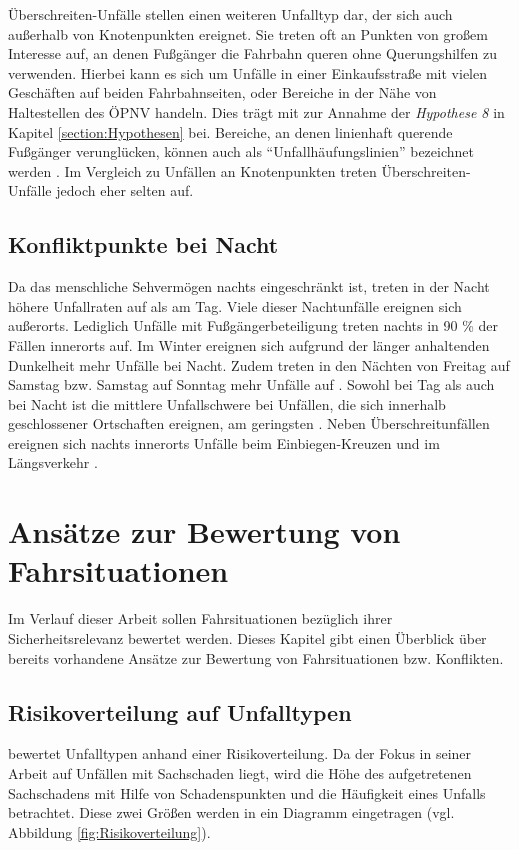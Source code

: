 Überschreiten-Unfälle stellen einen weiteren Unfalltyp dar, der sich auch außerhalb von Knotenpunkten ereignet. Sie treten oft an Punkten von großem Interesse auf, an denen Fußgänger die Fahrbahn queren ohne Querungshilfen zu verwenden. Hierbei kann es sich um Unfälle in einer Einkaufsstraße mit vielen Geschäften auf beiden Fahrbahnseiten, oder Bereiche in der Nähe von Haltestellen des \ac{ÖPNV} handeln. Dies trägt mit zur Annahme der \textit{Hypothese 8} in Kapitel \ref{section:Hypothesen} bei. Bereiche, an denen linienhaft querende Fußgänger verunglücken, können auch als \enquote{Unfallhäufungslinien} bezeichnet werden \parencite[S. 18]{ForschungsgesellschaftfurStraenundVerkehrswesen.2012}. Im Vergleich zu Unfällen an Knotenpunkten treten Überschreiten-Unfälle jedoch eher selten auf.

\subsection{Konfliktpunkte bei Nacht}
Da das menschliche Sehvermögen nachts eingeschränkt ist, treten in der Nacht höhere Unfallraten auf als am Tag. Viele dieser Nachtunfälle ereignen sich außerorts. Lediglich Unfälle mit Fußgängerbeteiligung treten nachts in 90 \% der Fällen innerorts auf. Im Winter ereignen sich aufgrund der länger anhaltenden Dunkelheit mehr Unfälle bei Nacht. Zudem treten in den Nächten von Freitag auf Samstag bzw. Samstag auf Sonntag mehr Unfälle auf  \parencite[S. 12]{DEKRA.2017}. Sowohl bei Tag als auch bei Nacht ist die mittlere Unfallschwere bei Unfällen, die sich innerhalb geschlossener Ortschaften ereignen, am geringsten \parencite[S. 18]{DEKRA.2017}. Neben Überschreitunfällen ereignen sich nachts innerorts Unfälle beim Einbiegen-Kreuzen und im Längsverkehr \parencite[S. 26]{DEKRA.2017}.


\section{Ansätze zur Bewertung von Fahrsituationen}\label{section:Ansätze zur Bewertung von Fahrsituationen}
Im Verlauf dieser Arbeit sollen Fahrsituationen bezüglich ihrer Sicherheitsrelevanz bewertet werden. Dieses Kapitel gibt einen Überblick über bereits vorhandene Ansätze zur Bewertung von Fahrsituationen bzw. Konflikten. %

\subsection{Risikoverteilung auf Unfalltypen}\label{subsection:Risikoverteilung auf Unfalltypen}
\Textcite[S. 60]{Gschwendtner.2015} bewertet Unfalltypen anhand einer Risikoverteilung. Da der Fokus in seiner Arbeit auf Unfällen mit Sachschaden liegt, wird die Höhe des aufgetretenen Sachschadens mit Hilfe von Schadenspunkten und die Häufigkeit eines Unfalls betrachtet. Diese zwei Größen werden in ein Diagramm eingetragen (vgl. Abbildung \ref{fig:Risikoverteilung}).

